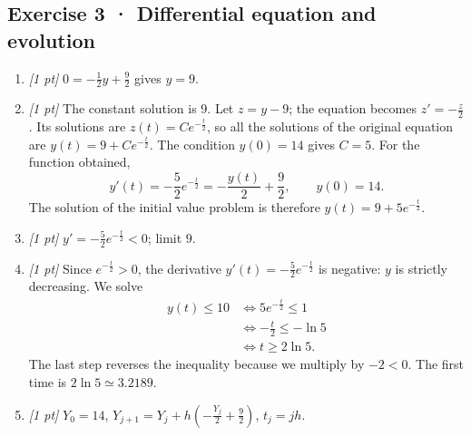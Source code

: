 \subsection*{Exercise 3 · Differential equation and evolution}\begin{enumerate}

\item \textit{[1 pt]} $0=-\frac{1}{2}y+\frac{9}{2}$ gives $y=9$.

\item \textit{[1 pt]} The constant solution is $9$. Let $z=y-9$; the equation becomes $z'=-\frac{z}{2}$. Its solutions are $z(t)=Ce^{-\frac{t}{2}}$, so all the solutions of the original equation are $y(t)=9+Ce^{-\frac{t}{2}}$.
The condition $y(0)=14$ gives $C=5$. For the function obtained,
\[y'(t)=-\frac{5}{2}e^{-\frac{t}{2}}=-\frac{y(t)}{2}+\frac{9}{2},\qquad y(0)=14.\]
The solution of the initial value problem is therefore $y(t)=9+5e^{-\frac{t}{2}}$.

\item \textit{[1 pt]} $y'=-\frac{5}{2}e^{-\frac{t}{2}}<0$; limit $9$.

\item \textit{[1 pt]} Since $e^{-\frac{t}{2}}>0$, the derivative $y'(t)=-\frac{5}{2}e^{-\frac{t}{2}}$ is negative: $y$ is strictly decreasing. We solve
\[\begin{aligned}y(t)\le 10&\Longleftrightarrow 5e^{-\frac{t}{2}}\le1\\&\Longleftrightarrow -\frac{t}{2}\le-\ln 5\\&\Longleftrightarrow t\ge 2\ln 5.\end{aligned}\]
The last step reverses the inequality because we multiply by $-2<0$. The first time is $2\ln 5\simeq3.2189$.

\item \textit{[1 pt]} $Y_0=14$, $Y_{j+1}=Y_j+h(-\frac{Y_j}{2}+\frac{9}{2})$, $t_j=jh$.

\end{enumerate}

